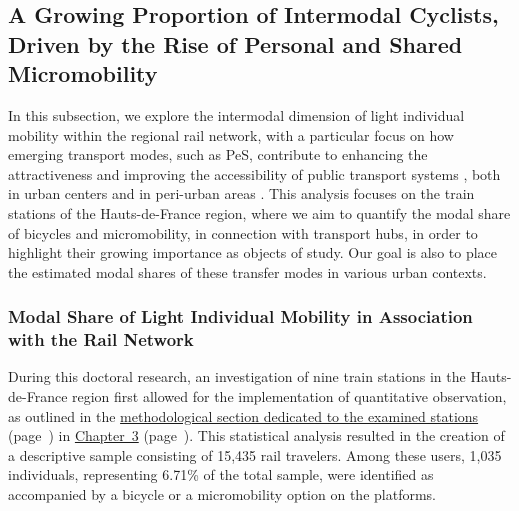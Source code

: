 \begin{refsegment}
\subsection{A Growing Proportion of Intermodal Cyclists, Driven by the Rise of Personal and Shared Micromobility
    \label{chap4:proportion-croissante-voyageurs-intermodaux}
    }

In this subsection, we explore the intermodal dimension of light individual mobility within the regional rail network, with a particular focus on how emerging transport modes, such as \acrfull{PeS}, contribute to enhancing the attractiveness and improving the accessibility of public transport systems \textcolor{blue}{\autocite[45]{corporate_partnership_board_good_2020}}, both in urban centers and in peri-urban areas \textcolor{blue}{\autocite[38]{stransky_periurbain_2019}}. This analysis focuses on the train stations of the Hauts-de-France region, where we aim to quantify the modal share of bicycles and micromobility, in connection with transport hubs, in order to highlight their growing importance as objects of study. Our goal is also to place the estimated modal shares of these transfer modes in various urban contexts.%

\subsubsection*{Modal Share of Light Individual Mobility in Association with the Rail Network
    \label{chap4:part-modale-velo-micromobilite}
    }

During this doctoral research, an investigation of nine train stations in the Hauts-de-France region first allowed for the implementation of quantitative observation, as outlined in the \hyperref[chap3:observation-quantitative-gares-examinees]{methodological section dedicated to the examined stations} (page~\pageref{chap3:observation-quantitative-gares-examinees}) in \hyperref[chap3:titre]{Chapter~3} (page~\pageref{chap3:titre}). This statistical analysis resulted in the creation of a descriptive sample consisting of 15,435 rail travelers. Among these users, 1,035 individuals, representing 6.71\% of the total sample, were identified as accompanied by a bicycle or a micromobility option on the platforms.%


\end{refsegment}
